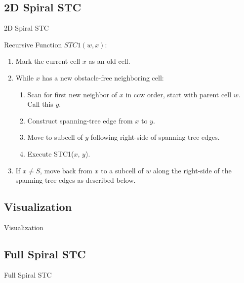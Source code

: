 \documentclass{beamer}
\begin{document}
\subsection{2D Spiral STC}
\begin{frame}{2D Spiral STC}
    \begin{block}{Recursive Function $STC1(w,x)$:}
        \begin{enumerate}
            \item Mark the current cell $x$ as an old cell.
            \item While $x$ has a new obstacle-free neighboring cell:
                  \begin{enumerate}
                      \item Scan for first new neighbor of $x$ in ccw order, start with parent cell $w$. Call this $y$.
                      \item Construct spanning-tree edge from $x$ to $y$.
                      \item Move to subcell of $y$ following right-side of spanning tree edges.
                      \item Execute STC1($x$, $y$).
                  \end{enumerate}
            \item If $x \neq S$, move back from $x$ to a subcell of $w$ along the right-side of the spanning tree edges as described below.
        \end{enumerate}
    \end{block}
\end{frame}
\subsection{Visualization}
\begin{frame}{Visualization}
\end{frame}
\subsection{Full Spiral STC}
\begin{frame}{Full Spiral STC}
\end{frame}
\end{document}
